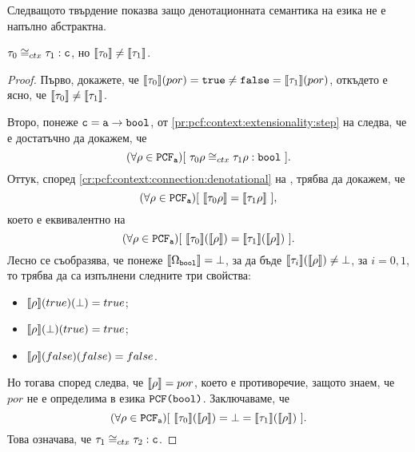 Следващото твърдение показва защо денотационната семантика на езика \PCFBOOL не е напълно абстрактна.
\begin{framed}
  \begin{proposition}
    \label{pr:full-abstraction:counter-example}
    $\tau_0 \cong_{ctx} \tau_1 : \texttt{c}$, но $\llbracket{\tau_0}\rrbracket \neq \llbracket{\tau_1}\rrbracket$.
\end{proposition}  
\end{framed}
\begin{proof}
  Първо, докажете, че $\llbracket{\tau_0}\rrbracket(por) = \texttt{true} \neq \texttt{false} = \llbracket{\tau_1}\rrbracket(por)$, откъдето е ясно, че $\llbracket{\tau_0}\rrbracket \neq \llbracket{\tau_1}\rrbracket$.
  
  Второ, понеже $\texttt{c} = \texttt{a} \to \texttt{bool}$, от \ref{pr:pcf:context:extensionality:step} на  следва, че е достатъчно да докажем, че
  \[(\forall \rho \in \texttt{PCF}_{\texttt{a}})[\ \tau_0\rho \cong_{ctx} \tau_1\rho : \texttt{bool}\ ].\]
  Оттук, според \ref{cr:pcf:context:connection:denotational} на ,
  трябва да докажем, че
  \[(\forall \rho \in \texttt{PCF}_{\texttt{a}})[\ \llbracket{\tau_0\rho}\rrbracket = \llbracket{\tau_1\rho}\rrbracket\ ],\]
  което е еквивалентно на
  \[(\forall \rho \in \PCF_{\vv{a}})[\ \val{\tau_0}(\val{\rho}) = \val{\tau_1}(\val{\rho})\ ].\]
  Лесно се съобразява, че понеже $\llbracket{\Omega_{\texttt{bool}}}\rrbracket = \bot$,
  за да бъде $\llbracket{\tau_i}\rrbracket(\llbracket{\rho}\rrbracket) \neq \bot$, за $i = 0,1$, то 
  трябва да са изпълнени следните три свойства:
  \begin{itemize}
  \item
    $\llbracket{\rho}\rrbracket(true)(\bot) = true$;
  \item
    $\llbracket{\rho}\rrbracket(\bot)(true) = true$;
  \item
    $\llbracket{\rho}\rrbracket(false)(false) = false$.
  \end{itemize}
  Но тогава според  следва, че $\llbracket{\rho}\rrbracket = por$, което е противоречие, защото знаем, че $por$ не е определима в езика $\texttt{PCF(bool)}$.
  Заключаваме, че 
  \[(\forall \rho \in \texttt{PCF}_{\texttt{a}})[\ \llbracket{\tau_0}\rrbracket(\llbracket{\rho}\rrbracket) = \bot = \llbracket{\tau_1}\rrbracket(\llbracket{\rho}\rrbracket)\ ].\]
  Това означава, че $\tau_1 \cong_{ctx} \tau_2 : \texttt{c}$.
\end{proof}

